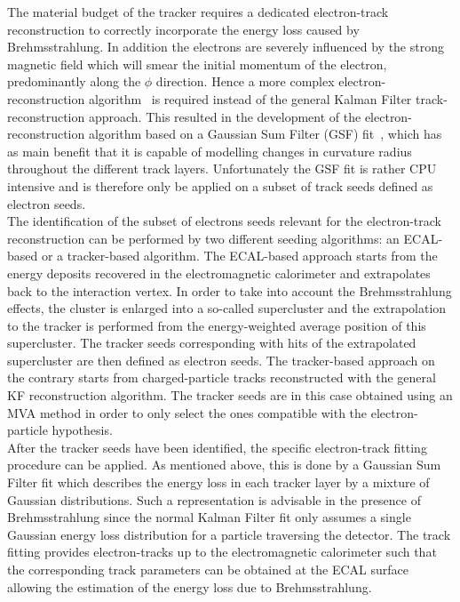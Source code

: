 The material budget of the tracker requires a dedicated electron-track reconstruction to correctly incorporate the energy loss caused by Brehmsstrahlung.
In addition the electrons are severely influenced by the strong magnetic field which will smear the initial momentum of the electron, predominantly along the $\phi$ direction.
Hence a more complex electron-reconstruction algorithm~\cite{CMSTDR, ElecReco} is required instead of the general Kalman Filter track-reconstruction approach.
This resulted in the development of the electron-reconstruction algorithm based on a Gaussian Sum Filter (GSF) fit~\cite{ElecGSF}, which has as main benefit that it is capable of modelling changes in curvature radius throughout the different track layers.
Unfortunately the GSF fit is rather CPU intensive and is therefore only be applied on a subset of track seeds defined as electron seeds.
\\

The identification of the subset of electrons seeds relevant for the electron-track reconstruction can be performed by two different seeding algorithms: an ECAL-based or a tracker-based algorithm.
The ECAL-based approach starts from the energy deposits recovered in the electromagnetic calorimeter and extrapolates back to the interaction vertex. In order to take into account the Brehmsstrahlung effects, the cluster is enlarged into a so-called supercluster and the extrapolation to the tracker is performed from the energy-weighted average position of this supercluster. The tracker seeds corresponding with hits of the extrapolated supercluster are then defined as electron seeds. The tracker-based approach on the contrary starts from charged-particle tracks reconstructed with the general KF reconstruction algorithm. The tracker seeds are in this case obtained using an MVA method in order to only select the ones compatible with the electron-particle hypothesis.
\\
After the tracker seeds have been identified, the specific electron-track fitting procedure can be applied. As mentioned above, this is done by a Gaussian Sum Filter fit which describes the energy loss in each tracker layer by a mixture of Gaussian distributions. Such a representation is advisable in the presence of Brehmsstrahlung since the normal Kalman Filter fit only assumes a single Gaussian energy loss distribution for a particle traversing the detector. The track fitting provides electron-tracks up to the electromagnetic calorimeter such that the corresponding track parameters can be obtained at the ECAL surface allowing the estimation of the energy loss due to Brehmsstrahlung.
\\

